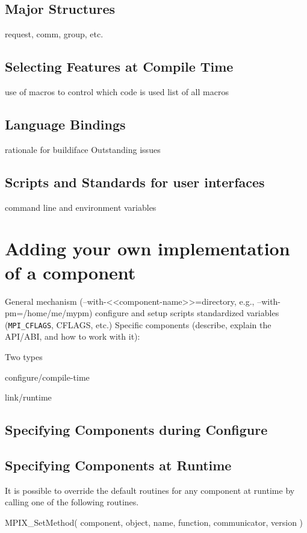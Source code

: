 \documentclass{report}
\begin{document}
\section{Major Structures}
      request, comm, group, etc.

\section{Selecting Features at Compile Time}
     use of macros to control which code is used
     list of all macros

\section{Language Bindings}
           rationale for buildiface
           Outstanding issues

\section{Scripts and Standards for user interfaces}
           command line and environment variables

\chapter{Adding your own implementation of a component}
         General mechanism (--with-<<component-name>>=directory, e.g., --with-pm=/home/me/mypm)
              configure and setup scripts
              standardized variables (\texttt{MPI\_CFLAGS}, CFLAGS, etc.)
         Specific components (describe, explain the API/ABI, and how to work with it):

Two types 

configure/compile-time

link/runtime

\section{Specifying Components during Configure}

\section{Specifying Components at Runtime}

It is possible to override the default routines for any component at
runtime by calling one of the following routines.

    MPIX_SetMethod( component, object, name, function, communicator,
    version )
\end{document}
